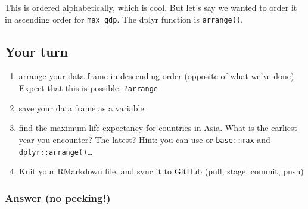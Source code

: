 \documentclass[]{book}
\newenvironment{Shaded}{\begin{snugshade}}{\end{snugshade}}
\newcommand{\KeywordTok}[1]{\textcolor[rgb]{0.13,0.29,0.53}{\textbf{#1}}}
\newcommand{\DataTypeTok}[1]{\textcolor[rgb]{0.13,0.29,0.53}{#1}}
\newcommand{\StringTok}[1]{\textcolor[rgb]{0.31,0.60,0.02}{#1}}
\newcommand{\OperatorTok}[1]{\textcolor[rgb]{0.81,0.36,0.00}{\textbf{#1}}}
\newcommand{\NormalTok}[1]{#1}
\providecommand{\tightlist}{%
  \setlength{\itemsep}{0pt}\setlength{\parskip}{0pt}}
\theoremstyle{definition}
\theoremstyle{definition}
\theoremstyle{definition}
\theoremstyle{remark}
\begin{document}
This is ordered alphabetically, which is cool. But let's say we wanted
to order it in ascending order for \texttt{max\_gdp}. The dplyr function
is \texttt{arrange()}.

\begin{Shaded}
\end{Shaded}

\subsection{Your turn}\label{your-turn-7}

\begin{enumerate}
\def\labelenumi{\arabic{enumi}.}
\tightlist
\item
  arrange your data frame in descending order (opposite of what we've
  done). Expect that this is possible: \texttt{?arrange}
\item
  save your data frame as a variable
\item
  find the maximum life expectancy for countries in Asia. What is the
  earliest year you encounter? The latest? Hint: you can use or
  \texttt{base::max} and \texttt{dplyr::arrange()}\ldots{}
\item
  Knit your RMarkdown file, and sync it to GitHub (pull, stage, commit,
  push)
\end{enumerate}

\subsubsection{Answer (no peeking!)}\label{answer-no-peeking}

\begin{Shaded}
\end{Shaded}
\end{document}
